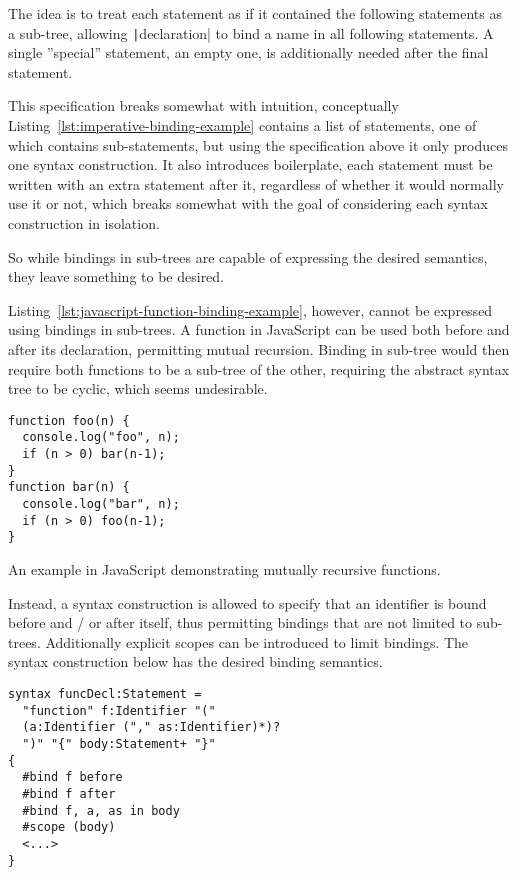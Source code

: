 \documentclass{kththesis}
\begin{document}
The idea is to treat each statement as if it contained the following statements as a sub-tree, allowing \texttt|declaration| to bind a name in all following statements. A single ''special'' statement, an empty one, is additionally needed after the final statement.

This specification breaks somewhat with intuition, conceptually Listing~\ref{lst:imperative-binding-example} contains a list of statements, one of which contains sub-statements, but using the specification above it only produces one syntax construction. It also introduces boilerplate, each statement must be written with an extra statement after it, regardless of whether it would normally use it or not, which breaks somewhat with the goal of considering each syntax construction in isolation.

So while bindings in sub-trees are capable of expressing the desired semantics, they leave something to be desired.

Listing~\ref{lst:javascript-function-binding-example}, however, cannot be expressed using bindings in sub-trees. A function in JavaScript can be used both before and after its declaration, permitting mutual recursion. Binding in sub-tree would then require both functions to be a sub-tree of the other, requiring the abstract syntax tree to be cyclic, which seems undesirable.

\begin{listing}
\begin{verbatim}
function foo(n) {
  console.log("foo", n);
  if (n > 0) bar(n-1);
}
function bar(n) {
  console.log("bar", n);
  if (n > 0) foo(n-1);
}
\end{verbatim}
\caption{An example in JavaScript demonstrating mutually recursive functions.}
\label{lst:javascript-function-binding-example}
\end{listing}

Instead, a syntax construction is allowed to specify that an identifier is bound before and / or after itself, thus permitting bindings that are not limited to sub-trees. Additionally explicit scopes can be introduced to limit bindings. The syntax construction below has the desired binding semantics.

\begin{verbatim}
syntax funcDecl:Statement =
  "function" f:Identifier "("
  (a:Identifier ("," as:Identifier)*)?
  ")" "{" body:Statement+ "}"
{
  #bind f before
  #bind f after
  #bind f, a, as in body
  #scope (body)
  <...>
}
\end{verbatim}
\end{document}
